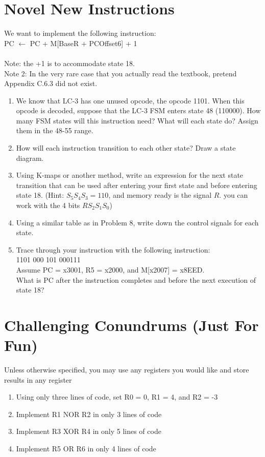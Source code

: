 \documentclass{article}
\begin{document}
    \section{Novel New Instructions}
    We want to implement the following instruction: \\
    PC $\longleftarrow$ PC + M[BaseR + PCOffset6] + 1 \\\\
    Note: the +1 is to accommodate state 18. \\
    Note 2: In the very rare case that you actually read the textbook, pretend Appendix C.6.3 did not exist.\\
    \begin{enumerate}[label=(\alph*),itemsep = 70pt]
        \item We know that LC-3 has one unused opcode, the opcode 1101. When this opcode is decoded, suppose that the LC-3 FSM enters state 48 (110000). How many FSM states will this instruction need? What will each state do? Assign them in the 48-55 range.
        \item How will each instruction transition to each other state? Draw a state diagram.
        \item Using K-maps or another method, write an expression for the next state transition that can be used after entering your first state and before entering state 18. (Hint: $S_5S_4S_3 = 110$, and memory ready is the signal $R$. you can work with the 4 bits $RS_2S_1S_0$)
        \item Using a similar table as in Problem 8, write down the control signals for each state.
        \item Trace through your instruction with the following instruction: \\
        1101 000 101 000111 \\
        Assume PC = x3001, R5 = x2000, and M[x2007] = x8EED. \\
        What is PC after the instruction completes and before the next execution of state 18?
    \end{enumerate}
    
    \newpage \section{Challenging Conundrums (Just For Fun)}
    Unless otherwise specified, you may use any registers you would like and store results in any register
    \begin{enumerate}[label=(\alph*), itemsep = 120pt]
        \item Using only three lines of code, set R0 = 0, R1 = 4, and R2 = -3
        \item Implement R1 NOR R2 in only 3 lines of code
        \item Implement R3 XOR R4 in only 5 lines of code
        \item Implement R5 OR R6 in only 4 lines of code
    \end{enumerate}
\end{document}
